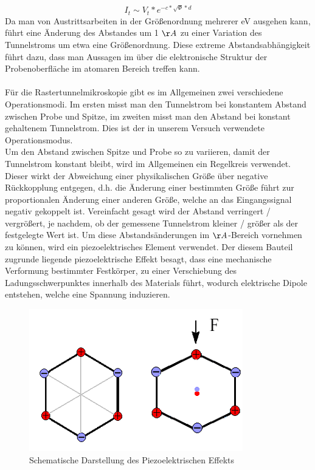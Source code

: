 \documentclass[10pt,a4paper]{article}
\begin{document}
	\begin{equation}
	I_{t} \sim V_{t} * e^{-c*\sqrt{\Phi }*d}
	\end{equation}
	Da man von Austrittsarbeiten in der Größenordnung mehrerer eV ausgehen kann, führt eine Änderung des Abstandes um 1 $\AA$ zu einer Variation des Tunnelstroms um etwa eine Größenordnung. Diese extreme Abstandsabhängigkeit führt dazu, dass man Aussagen im über die elektronische Struktur der Probenoberfläche im atomaren Bereich treffen kann. \\ \\Für die Rastertunnelmikroskopie gibt es im Allgemeinen zwei verschiedene Operationsmodi. Im ersten misst man den Tunnelstrom bei konstantem Abstand zwischen Probe und Spitze, im zweiten misst man den Abstand bei konstant gehaltenem Tunnelstrom. Dies ist der in unserem Versuch verwendete Operationsmodus. \\Um den Abstand zwischen Spitze und Probe so zu variieren, damit der Tunnelstrom konstant bleibt, wird im Allgemeinen ein Regelkreis verwendet. Dieser wirkt der Abweichung einer physikalischen Größe über negative Rückkopplung entgegen, d.h. die Änderung einer bestimmten Größe führt zur proportionalen Änderung einer anderen Größe, welche an das Eingangssignal negativ gekoppelt ist. Vereinfacht gesagt wird der Abstand verringert / vergrößert, je nachdem, ob der gemessene Tunnelstrom  kleiner / größer als der festgelegte Wert ist. Um diese Abstandsänderungen im $\AA$-Bereich vornehmen zu können, wird ein piezoelektrisches Element verwendet. Der diesem Bauteil zugrunde liegende piezoelektrische Effekt besagt, dass eine mechanische Verformung bestimmter Festkörper, zu einer Verschiebung des Ladungsschwerpunktes innerhalb des Materials führt, wodurch elektrische Dipole entstehen, welche eine Spannung induzieren.
	\begin{figure}[h]
		\includegraphics[scale = 1]{1piezo.png}
		\centering
		\caption{Schematische Darstellung des Piezoelektrischen Effekts}
		\label{diagramm_aufspaltung}
	\end{figure}
\end{document}
